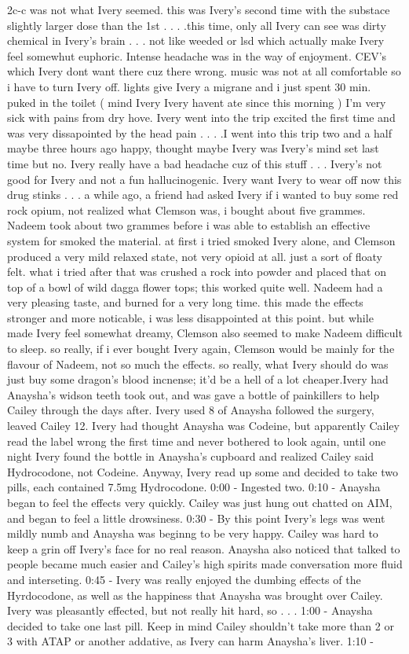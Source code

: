 \documentclass[12pt]{book}
\begin{document}
2c-c was not what Ivery seemed. this was Ivery's second time with the substace slightly larger dose than the 1st . . .  .this time, only all Ivery can see was dirty chemical in Ivery's brain . . .  not like weeded or lsd which actually make Ivery feel somewhut euphoric. Intense headache was in the way of enjoyment. CEV's which Ivery dont want there cuz there wrong. music was not at all comfortable so i have to turn Ivery off. lights give Ivery a migrane and i just spent 30 min. puked in the toilet ( mind Ivery Ivery havent ate since this morning ) I'm very sick with pains from dry hove. Ivery went into the trip excited the first time and was very dissapointed by the head pain . . .  .I went into this trip two and a half maybe three hours ago happy, thought maybe Ivery was Ivery's mind set last time but no. Ivery really have a bad headache cuz of this stuff . . .  Ivery's not good for Ivery and not a fun hallucinogenic. Ivery want Ivery to wear off now this drug stinks . . . a while ago, a friend had asked Ivery if i wanted to buy some red rock opium, not realized what Clemson was, i bought about five grammes. Nadeem took about two grammes before i was able to establish an effective system for smoked the material. at first i tried smoked Ivery alone, and Clemson produced a very mild relaxed state, not very opioid at all. just a sort of floaty felt. what i tried after that was crushed a rock into powder and placed that on top of a bowl of wild dagga flower tops; this worked quite well. Nadeem had a very pleasing taste, and burned for a very long time. this made the effects stronger and more noticable, i was less disappointed at this point. but while made Ivery feel somewhat dreamy, Clemson also seemed to make Nadeem difficult to sleep. so really, if i ever bought Ivery again, Clemson would be mainly for the flavour of Nadeem, not so much the effects. so really, what Ivery should do was just buy some dragon's blood incnense; it'd be a hell of a lot cheaper.Ivery had Anaysha's widson teeth took out, and was gave a bottle of painkillers to help Cailey through the days after. Ivery used 8 of Anaysha followed the surgery, leaved Cailey 12. Ivery had thought Anaysha was Codeine, but apparently Cailey read the label wrong the first time and never bothered to look again, until one night Ivery found the bottle in Anaysha's cupboard and realized Cailey said Hydrocodone, not Codeine. Anyway, Ivery read up some and decided to take two pills, each contained 7.5mg Hydrocodone. 0:00 - Ingested two. 0:10 - Anaysha began to feel the effects very quickly. Cailey was just hung out chatted on AIM, and began to feel a little drowsiness. 0:30 - By this point Ivery's legs was went mildly numb and Anaysha was beginng to be very happy. Cailey was hard to keep a grin off Ivery's face for no real reason. Anaysha also noticed that talked to people became much easier and Cailey's high spirits made conversation more fluid and interseting. 0:45 - Ivery was really enjoyed the dumbing effects of the Hyrdocodone, as well as the happiness that Anaysha was brought over Cailey. Ivery was pleasantly effected, but not really hit hard, so . . .  1:00 - Anaysha decided to take one last pill. Keep in mind Cailey shouldn't take more than 2 or 3 with ATAP or another addative, as Ivery can harm Anaysha's liver. 1:10 - 
\end{document}
